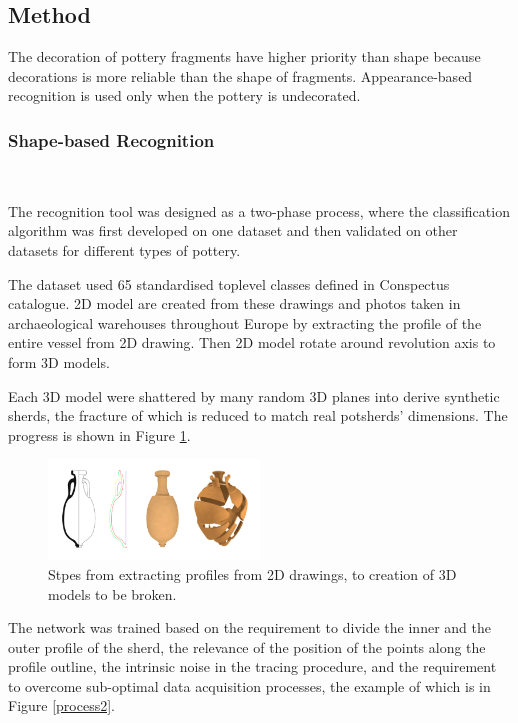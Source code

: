 \documentclass[journal]{IEEEtran}
\begin{document}
	
	\subsection{Method}\label{method}
	
	The decoration of pottery fragments have higher priority than shape because decorations is more reliable than the shape of fragments. Appearance-based recognition is used only when the pottery is undecorated.
	
	\subsubsection{Shape-based Recognition}
	\ 
	
	The recognition tool was designed as a two-phase process, where the classification algorithm was first developed on one dataset and then validated on other datasets for different types of pottery.
	
	The dataset used 65 standardised toplevel classes defined in Conspectus catalogue\cite{first_phase}. 2D model are created from these drawings and photos taken in archaeological warehouses throughout Europe by extracting the profile of the entire vessel from 2D drawing. Then 2D model rotate around revolution axis to form 3D models.
	
	Each 3D model were shattered by many random 3D planes into derive synthetic sherds, the fracture of which is reduced to match real potsherds' dimensions. \cite{Dellepiane2017FromPT} The progress is shown in Figure \ref{process}.

	\begin{figure}[htbp]
		\centering
		\includegraphics[width=0.5\textwidth]{./picture/process.png}
		\caption{Stpes from extracting profiles from 2D drawings, to creation of 3D models to be broken.}
		\label{process}
	\end{figure} 

	The network was trained based on the requirement to divide the inner and the outer profile of the sherd, the relevance of the position of the points along the profile outline, the intrinsic noise in the tracing procedure, and the requirement to overcome sub-optimal data acquisition processes\cite{ANICHINI2021102788}, the example of which is in Figure \ref{process2}.
	
\end{document}
